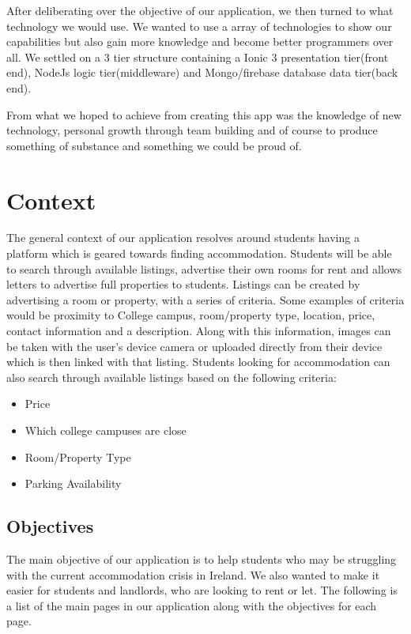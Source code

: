 After deliberating over the objective of our application, we then turned to what technology we would use. We wanted to use a array of technologies to show our capabilities but also gain more knowledge and become better programmers over all. We settled on a 3 tier structure containing a Ionic 3 presentation tier(front end), NodeJs logic tier(middleware)  and Mongo/firebase database data tier(back end).

From what we hoped to achieve from creating this app was the knowledge of new technology, personal growth through team building and of course to produce something of substance and something we could be proud of.

\chapter{Context}
The general context of our application resolves around students having a platform which is geared towards finding accommodation. Students will be able to search through available listings, advertise their own rooms for rent and allows letters to advertise full properties to students. Listings can be created by advertising a room or property, with a series of criteria. Some examples of criteria would be proximity to College campus, room/property type, location, price, contact information and a description. Along with this information, images can be taken with the user’s device camera or uploaded directly from their device which is then linked with that listing. Students looking for accommodation can also search through available listings based on the following criteria: 

\begin{itemize}
  \item Price
  \item Which college campuses are close
  \item Room/Property Type
  \item Parking Availability
\end{itemize}

\section{Objectives} \label{objectives}
The main objective of our application is to help students who may be struggling with the current accommodation crisis in Ireland. We also wanted to make it easier for students and landlords, who are looking to rent or let. The following is a list of the main pages in our application along with the objectives for each page. 

